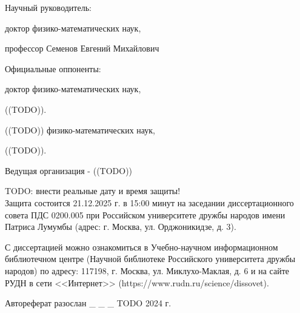 \documentclass[12pt]{article}
\begin{document}
\vspace{10mm}



\begin{minipage}[t]{7cm}
	Научный руководитель:
\end{minipage}
%
\begin{minipage}[t]{10cm}

доктор физико-математических наук,

профессор Семенов Евгений Михайлович

\end{minipage}

\vspace{10mm}

Официальные оппоненты:

\hspace{25mm}доктор физико-математических наук,

\hspace{25mm}((TODO)).

\vspace{10mm}

\hspace{25mm}((TODO)) физико-математических наук,

\hspace{25mm}((TODO)).


\bigskip

Ведущая организация - ((TODO))

\vspace{10mm}

TODO: внести реальные дату и время защиты!
\\
Защита состоится 21.12.2025 г. в 15:00 минут
на заседании диссертационного совета
ПДС 0200.005 при Российском университете дружбы народов имени Патриса Лумумбы
(адрес: г. Москва, ул. Орджоникидзе, д. 3).

\vspace{5mm}

С диссертацией можно ознакомиться в
Учебно-научном информационном библиотечном центре
(Научной библиотеке Российского университета дружбы народов)
по адресу: 117198, г. Москва, ул. Миклухо-Маклая, д. 6
и на сайте РУДН в сети <<Интернет>>
(https://www.rudn.ru/science/dissovet).

\vspace{10mm}

Автореферат разослан \_ \_ \_ TODO 2024 г.

\vspace{10mm}


\vfill
\end{document}
